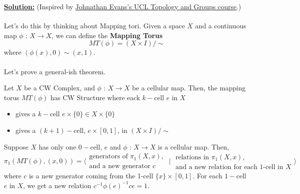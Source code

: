 \documentclass[11pt]{article}
\begin{document}
\vskip 0.5cm
\textbf{\underline{Solution:}} (Inspired by \href{https://www.homepages.ucl.ac.uk/~ucahjde/tg/html/vkt03.html}{Johnathan Evans's UCL Topology and Groups course}.)
\\
\\
Let's do this by thinking about Mapping tori. Given a space $X$ and a continuous map $\phi \text{ : } X  \rightarrow X$, we can define the \textbf{Mapping Torus} $$ MT(\phi) = (X \times I)/\sim $$ where $(\phi(x), 0) \sim (x, 1)$.
\\
\\
Let's prove a general-ish theorem. 

\begin{theorem}
  Let $X$ be a CW Complex, and $\phi \text{ : } X \rightarrow X$ be a cellular map. Then, the mapping torus $MT(\phi)$ has CW Structure where eack $k-$cell $e$ in $X$ 
  \begin{itemize}
    \item gives a $k-$cell $e \times \{0\} \in X \times \{0\}$
    \item gives a $(k+1)-$cell, $e \times [0, 1]$, in $(X \times I)/\sim$ 
  \end{itemize}
\end{theorem}

\begin{redbox}
  \begin{theorem}
    Suppose $X$ has only one $0-$cell, $e$ and $\phi \text{ : } X \rightarrow X$ is a cellular map. Then, 
    $$ \pi_1(MT(\phi), (x, 0)) = \Big\langle \begin{matrix} \text{generators of } \pi_1(X, x), \\ \text{and a new generator }c \end{matrix} \;\Big|\; \begin{matrix}
      \text{relations in } \pi_1(X, x), \\
       \text{and a new relation for each 1-cell in } X 
    \end{matrix} \Big\rangle $$ where $c$ is a new generator coming from the 1-cell $\{x\} \times [0, 1]$. For each $1-$cell $e$ in $X$, we get a new relation $c^{-1} \phi(e)^{-1} ce = 1$.
  \end{theorem}
\end{redbox}
\end{document}
